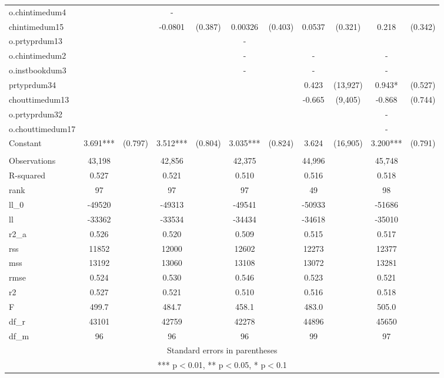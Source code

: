 \documentclass[]{article}
\begin{document}
\begin{tabular}{lcccccccccc}
o.chintimedum4 &  &  & - &  &  &  &  &  &  &  \\
chintimedum15 &  &  & -0.0801 & (0.387) & 0.00326 & (0.403) & 0.0537 & (0.321) & 0.218 & (0.342) \\
o.prtyprdum13 &  &  &  &  & - &  &  &  &  &  \\
o.chintimedum2 &  &  &  &  & - &  & - &  & - &  \\
o.instbookdum3 &  &  &  &  & - &  & - &  & - &  \\
prtyprdum34 &  &  &  &  &  &  & 0.423 & (13,927) & 0.943* & (0.527) \\
chouttimedum13 &  &  &  &  &  &  & -0.665 & (9,405) & -0.868 & (0.744) \\
o.prtyprdum32 &  &  &  &  &  &  &  &  & - &  \\
o.chouttimedum17 &  &  &  &  &  &  &  &  & - &  \\
Constant & 3.691*** & (0.797) & 3.512*** & (0.804) & 3.035*** & (0.824) & 3.624 & (16,905) & 3.200*** & (0.791) \\
 &  &  &  &  &  &  &  &  &  &  \\
Observations & 43,198 &  & 42,856 &  & 42,375 &  & 44,996 &  & 45,748 &  \\
R-squared & 0.527 &  & 0.521 &  & 0.510 &  & 0.516 &  & 0.518 &  \\
rank & 97 &  & 97 &  & 97 &  & 49 &  & 98 &  \\
ll\_0 & -49520 &  & -49313 &  & -49541 &  & -50933 &  & -51686 &  \\
ll & -33362 &  & -33534 &  & -34434 &  & -34618 &  & -35010 &  \\
r2\_a & 0.526 &  & 0.520 &  & 0.509 &  & 0.515 &  & 0.517 &  \\
rss & 11852 &  & 12000 &  & 12602 &  & 12273 &  & 12377 &  \\
mss & 13192 &  & 13060 &  & 13108 &  & 13072 &  & 13281 &  \\
rmse & 0.524 &  & 0.530 &  & 0.546 &  & 0.523 &  & 0.521 &  \\
r2 & 0.527 &  & 0.521 &  & 0.510 &  & 0.516 &  & 0.518 &  \\
F & 499.7 &  & 484.7 &  & 458.1 &  & 483.0 &  & 505.0 &  \\
df\_r & 43101 &  & 42759 &  & 42278 &  & 44896 &  & 45650 &  \\
 df\_m & 96 &  & 96 &  & 96 &  & 99 &  & 97 &  \\ \hline
\multicolumn{11}{c}{ Standard errors in parentheses} \\
\multicolumn{11}{c}{ *** p$<$0.01, ** p$<$0.05, * p$<$0.1} \\
\end{tabular}
\end{document}
